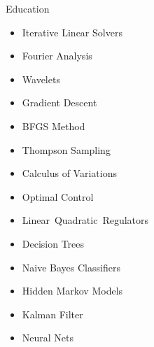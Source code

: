 \documentclass{resume}
\begin{document}
\begin{rSection}{Education}
\begin{rSubsection}
\begin{itemize}[label = \vspace{0ex}, itemsep = -5pt, topsep=-3pt]
\begin{multicols}{3}
\begin{itemize}[noitemsep, topsep=0pt, label = $\cdot$]
                    \item Iterative Linear Solvers
                    \item Fourier Analysis
                    \item Wavelets
                    \item Gradient Descent
                    \item BFGS Method
                    \item Thompson Sampling
                    \item Calculus of Variations
                    \item Optimal Control
                    \item \mbox{Linear Quadratic Regulators}
                    \item Decision Trees
                    \item Naive Bayes Classifiers
                    \item Hidden Markov Models
                    \item Kalman Filter
                    \item Neural Nets
                \end{itemize}
                \end{multicols}
            \end{itemize}
        \vspace{9pt}
            

\end{rSubsection}
\end{rSection}
\end{document}
